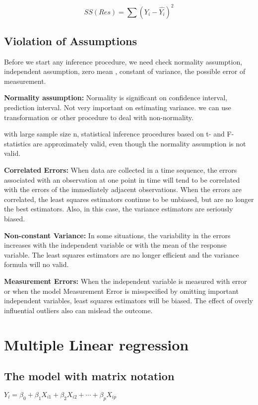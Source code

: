 \documentclass[12pt]{article}
\begin{document}
$$SS(Res) = \sum(Y_i - \hat{Y_i})^2$$

\subsection{Violation of Assumptions}

Before we start any inference procedure, we need check normality assumption, independent assumption, zero mean , constant of variance, the possible error of measurement.

\textbf{Normality assumption:}
Normality is significant on confidence interval, prediction interval. Not very important on estimating variance. we can use
transformation or other procedure to deal with non-normality.

with large sample size n, statistical inference procedures based on t- and F-statistics are approximately valid, even though the normality assumption is not valid.

\textbf{Correlated Errors:}
When data are collected in a time sequence, the errors associated with an observation at one point in time will tend to be correlated with the errors of the immediately adjacent observations. When the errors are correlated, the least squares estimators continue to be unbiased, but are no longer the best estimators. Also, in this case, the variance estimators are seriously biased.

\textbf{Non-constant Variance:}
In some situations, the variability in the errors increases with the independent variable or with the mean of the response variable. The least squares estimators are no longer efficient and the variance formula will no valid.

\textbf{Measurement Errors:}
When the independent variable is measured with error or when the model Measurement Error is misspecified by omitting important independent variables, least squares estimators will be biased.
The effect of overly influential outliers also can mislead the outcome.

\section{Multiple Linear regression}

\subsection{The model with matrix notation}

$Y_i = \beta_0 +\beta_1 X_{i1} +\beta_2 X_{i2} + \cdots +\beta_p X_{ip}$
\end{document}
